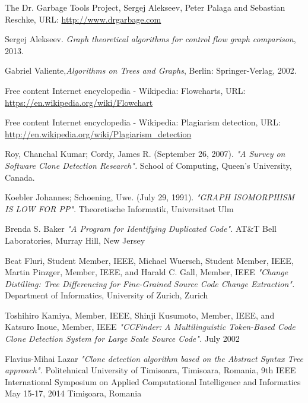 \documentclass{report}
\begin{document}
\newpage
%
\begin{thebibliography}{100} %

 The Dr. Garbage Tools Project\textregistered {}, Sergej Alekseev, Peter Palaga and Sebastian Reschke, URL:
\url{http://www.drgarbage.com}

  Sergej Alekseev. \emph{ Graph theoretical algorithms for control flow graph comparison}, 2013.
 
 Gabriel Valiente,\emph{Algorithms on Trees and Graphs}, Berlin: Springer-Verlag, 2002.

 Free content Internet encyclopedia - Wikipedia: Flowcharts, URL: \url{https://en.wikipedia.org/wiki/Flowchart}

 Free content Internet encyclopedia - Wikipedia: Plagiarism detection, URL: \url{http://en.wikipedia.org/wiki/Plagiarism_detection}
 
 Roy, Chanchal Kumar; Cordy, James R. (September 26, 2007). \emph{"A Survey on Software Clone Detection Research".} School of Computing, Queen's University, Canada.

 Koebler Johannes; Schoening, Uwe. (July 29, 1991). \emph{"GRAPH ISOMORPHISM IS LOW FOR PP".} Theoretische Informatik, Universitaet Ulm

 Brenda S. Baker \emph{"A Program for Identifying Duplicated Code".} AT\&T Bell Laboratories, Murray Hill, New Jersey

 Beat Fluri, Student Member, IEEE, Michael Wuersch, Student Member, IEEE, Martin Pinzger, Member, IEEE, and Harald C. Gall, Member, IEEE \emph{"Change Distilling: Tree Differencing for Fine-Grained Source Code Change Extraction".} Department of Informatics, University of Zurich, Zurich 

 Toshihiro Kamiya, Member, IEEE, Shinji Kusumoto, Member, IEEE, and Katsuro Inoue, Member, IEEE \emph{"CCFinder: A Multilinguistic Token-Based Code Clone Detection System for Large Scale Source Code".} July 2002

 Flavius-Mihai Lazar \emph{"Clone detection algorithm based on the Abstract Syntax Tree approach".} Politehnical University of Timisoara, Timisoara, Romania, 9th IEEE International Symposium on Applied Computational Intelligence and Informatics May 15-17, 2014 Timişoara, Romania


\end{thebibliography}
\end{document}
